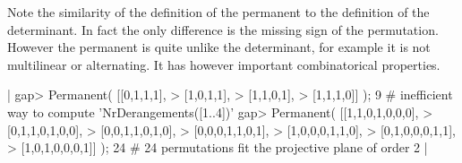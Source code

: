 Note the similarity of the definition of  the permanent to the definition
of the determinant.  In  fact the only  difference is the missing sign of
the permutation.  However the  permanent is quite unlike the determinant,
for example   it is  not  multilinear or  alternating.  It   has  however
important combinatorical properties.

|    gap> Permanent( [[0,1,1,1],
    >                [1,0,1,1],
    >                [1,1,0,1],
    >                [1,1,1,0]] );
    9    # inefficient way to compute 'NrDerangements([1..4])'
    gap> Permanent( [[1,1,0,1,0,0,0],
    >                [0,1,1,0,1,0,0],
    >                [0,0,1,1,0,1,0],
    >                [0,0,0,1,1,0,1],
    >                [1,0,0,0,1,1,0],
    >                [0,1,0,0,0,1,1],
    >                [1,0,1,0,0,0,1]] );
    24    # 24 permutations fit the projective plane of order 2 |




